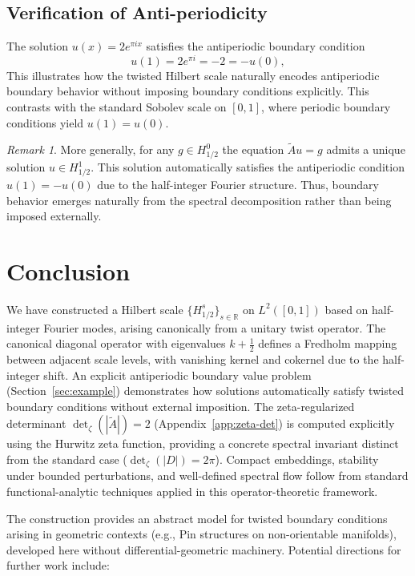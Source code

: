 \documentclass[11pt]{amsart}
\theoremstyle{definition}
\theoremstyle{remark}
\newtheorem{remark}[theorem]{Remark}
\begin{document}
\subsection{Verification of Anti-periodicity}

The solution $u(x)=2e^{\pi i x}$ satisfies the antiperiodic boundary condition
\[
u(1)=2e^{\pi i}=-2=-u(0),
\]
This illustrates how the twisted Hilbert scale naturally encodes antiperiodic boundary behavior without imposing boundary conditions explicitly. This contrasts with the standard Sobolev scale on $[0,1]$, where periodic boundary conditions yield $u(1)=u(0)$.

\begin{remark}
More generally, for any $g\in H^0_{1/2}$ the equation $\widetilde{A}u=g$ admits a unique solution
$u\in H^1_{1/2}$. This solution automatically satisfies the antiperiodic condition
$u(1)=-u(0)$ due to the half-integer Fourier structure. Thus, boundary behavior emerges naturally from the spectral decomposition rather than being imposed externally.
\end{remark}


\section{Conclusion}
\label{sec:conclusion}

We have constructed a Hilbert scale $\{H^s_{1/2}\}_{s \in \mathbb{R}}$ on $L^2([0,1])$ based on half-integer Fourier modes, arising canonically from a unitary twist operator. The canonical diagonal operator with eigenvalues $k + \tfrac{1}{2}$ defines a Fredholm mapping between adjacent scale levels, with vanishing kernel and cokernel due to the half-integer shift. An explicit antiperiodic boundary value problem (Section~\ref{sec:example}) demonstrates how solutions automatically satisfy twisted boundary conditions without external imposition. The zeta-regularized determinant $\det_\zeta(|\widetilde{A}|) = 2$ (Appendix~\ref{app:zeta-det}) is computed explicitly using the Hurwitz zeta function, providing a concrete spectral invariant distinct from the standard case ($\det_\zeta(|D|) = 2\pi$). Compact embeddings, stability under bounded perturbations, and well-defined spectral flow follow from standard functional-analytic techniques applied in this operator-theoretic framework.

The construction provides an abstract model for twisted boundary conditions arising in geometric contexts (e.g., Pin structures on non-orientable manifolds), developed here without differential-geometric machinery. Potential directions for further work include:
\end{document}
